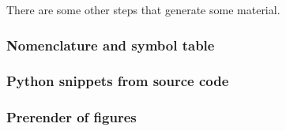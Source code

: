 There are some other steps that generate some material.

\subsubsection{Nomenclature and symbol table}


\subsubsection{Python snippets from source code}


\subsubsection{Prerender of figures}

